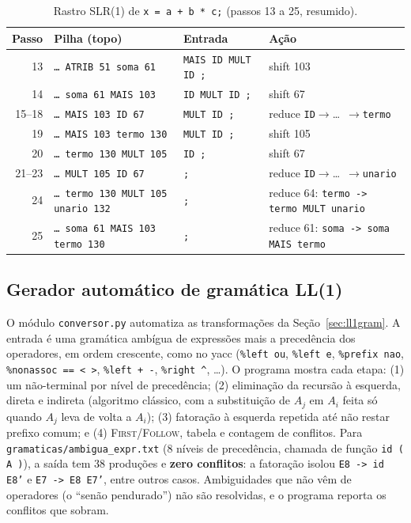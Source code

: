 \documentclass[conference]{IEEEtran}
\begin{document}
\begin{table}[t]
\centering
\caption{Rastro SLR(1) de \texttt{x = a + b * c;} (passos 13 a 25, resumido).}\label{tab:rastroslr}
\scriptsize
\begin{tabular}{@{}rlll@{}}
\toprule
Passo & Pilha (topo) & Entrada & Ação \\
\midrule
13 & \texttt{\dots\ ATRIB 51 soma 61}              & \texttt{MAIS ID MULT ID ;} & shift 103 \\
14 & \texttt{\dots\ soma 61 MAIS 103}              & \texttt{ID MULT ID ;}      & shift 67 \\
15--18 & \texttt{\dots\ MAIS 103 ID 67}             &\texttt{MULT ID ;}         & reduce \texttt{ID}$\to$\dots\ $\to$\texttt{termo} \\
19 & \texttt{\dots\ MAIS 103 termo 130}            & \texttt{MULT ID ;}         & shift 105 \\
20 & \texttt{\dots\ termo 130 MULT 105}            & \texttt{ID ;}              & shift 67 \\
21--23 & \texttt{\dots\ MULT 105 ID 67}            &\texttt{;}                 & reduce \texttt{ID}$\to$\dots\ $\to$\texttt{unario} \\
24 & \texttt{\dots\ termo 130 MULT 105 unario 132} & \texttt{;}                 & reduce 64: \texttt{termo -> termo MULT unario} \\
25 & \texttt{\dots\ soma 61 MAIS 103 termo 130}    & \texttt{;}                 & reduce 61: \texttt{soma -> soma MAIS termo} \\
\bottomrule
\end{tabular}
\end{table}

\subsection{Gerador automático de gramática LL(1)}\label{sec:conversor}
O módulo \texttt{conversor.py} automatiza as transformações da
Seção~\ref{sec:ll1gram}. A entrada é uma gramática ambígua de expressões
mais a precedência dos operadores, em ordem crescente, como no yacc
(\texttt{\%left ou}, \texttt{\%left e}, \texttt{\%prefix nao},
\texttt{\%nonassoc == < >}, \texttt{\%left + -}, \texttt{\%right \^{}}, \dots). O
programa mostra cada etapa: (1) um não-terminal por nível de precedência;
(2) eliminação da recursão à esquerda, direta e indireta (algoritmo clássico,
com a substituição de $A_j$ em $A_i$ feita só quando $A_j$ leva de volta a $A_i$);
(3) fatoração à esquerda repetida até não restar prefixo comum; e
(4) \textsc{First}/\textsc{Follow}, tabela e contagem de conflitos. Para
\texttt{gramaticas/ambigua\_expr.txt} (8 níveis de precedência, chamada de
função \texttt{id ( A )}), a saída tem 38 produções e \textbf{zero conflitos}: a
fatoração isolou \texttt{E8 -> id E8'} e \texttt{E7 -> E8 E7'}, entre outros
casos. Ambiguidades que não vêm de operadores (o ``senão pendurado'') não são
resolvidas, e o programa reporta os conflitos que sobram.
\end{document}
